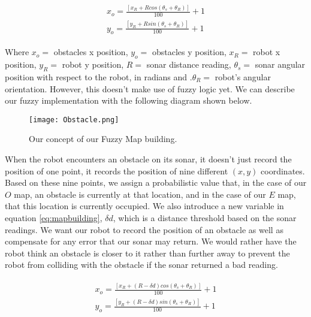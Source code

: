 \documentclass[12pt]{article}
\begin{document}
\begin{eqnarray}
	\begin{array}{ll}
	x_o = \frac{[ x_R + R cos(\theta_s + \theta_R ) ]}{100} + 1 \\
	y_o = \frac{[ y_R + R sin(\theta_s + \theta_R ) ]}{100} + 1 
	\end{array} \label{eq:mapbuilding}
\end{eqnarray}

Where $ x_o =$ obstacles x position, $y_o =$ obstacles y position, $x_R =$ robot x position, $y_R =$ robot y position, $R =$ sonar distance reading, $\theta_s =$ sonar angular position with respect to the robot, in radians and .$\theta_R =$ robot's angular orientation. However, this doesn't make use of fuzzy logic yet. We can describe our fuzzy implementation with the following diagram shown below.

\begin{figure}[htp!]
	\begin{center}
		\texttt{[image: Obstacle.png]}
		\caption{Our concept of our Fuzzy Map building.} \label{fig.fuz}
	\end{center}
\end{figure}

When the robot encounters an obstacle on its sonar, it doesn't just record the position of one point, it records the position of nine different $(x,y)$ coordinates. Based on these nine points, we assign a probabilistic value that, in the case of our $O$ map, an obstacle is currently at that location, and in the case of our $E$ map, that this location is currently occupied. We also introduce a new variable in equation \ref{eq:mapbuilding}, $\delta d$, which is a distance threshold based on the sonar readings. We want our robot to record the position of an obstacle as well as compensate for any error that our sonar may return. We would rather have the robot think an obstacle is closer to it rather than further away to prevent the robot from colliding with the obstacle if the sonar returned a bad reading.

\begin{eqnarray}
	\begin{array}{ll}
		x_o = \frac{[ x_R + (R - \delta d) cos(\theta_s + \theta_R ) ]}{100} + 1 \\
		y_o = \frac{[ y_R + (R - \delta d) sin(\theta_s + \theta_R ) ]}{100} + 1
	\end{array} \label{eq:mapbuilding_distance}
\end{eqnarray}
\end{document}
